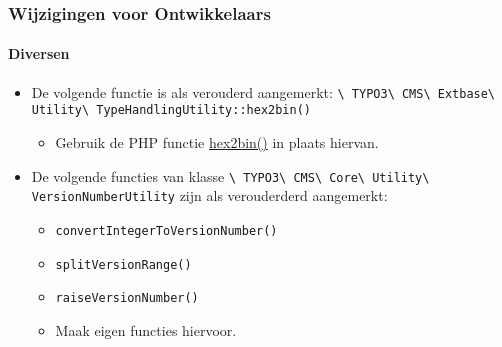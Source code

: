 \begin{frame}[fragile]
	\frametitle{Wijzigingen voor Ontwikkelaars}
	\framesubtitle{Diversen}

	\begin{itemize}

		\item De volgende functie is als verouderd aangemerkt:\newline
			\smaller\texttt{\textbackslash
				TYPO3\textbackslash
				CMS\textbackslash
				Extbase\textbackslash
				Utility\textbackslash
				TypeHandlingUtility::hex2bin()}\normalsize

			\begin{itemize}\smaller
				\item[\ding{228}] Gebruik de PHP functie \href{https://www.php.net/manual/en/function.hex2bin.php}{hex2bin()} in plaats hiervan.
			\end{itemize}\normalsize

		\item De volgende functies van klasse
			\smaller\texttt{\textbackslash
				TYPO3\textbackslash
				CMS\textbackslash
				Core\textbackslash
				Utility\textbackslash
				VersionNumberUtility}\normalsize\newline
			zijn als verouderderd aangemerkt:

			\begin{itemize}
				\item \texttt{convertIntegerToVersionNumber()}
				\item \texttt{splitVersionRange()}
				\item \texttt{raiseVersionNumber()}
			\end{itemize}

			\begin{itemize}\smaller
				\item[\ding{228}] Maak eigen functies hiervoor.
			\end{itemize}\normalsize

	\end{itemize}

\end{frame}


